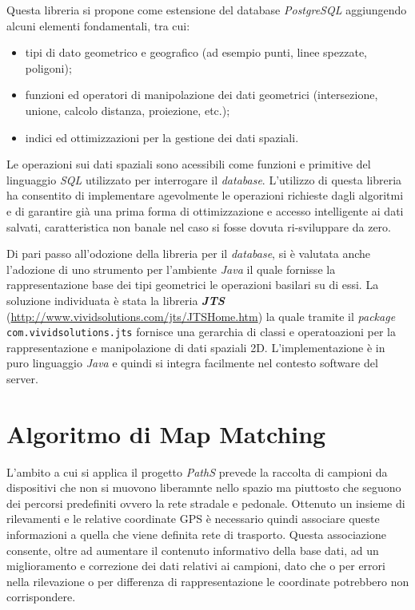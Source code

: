 Questa libreria si propone come estensione del database \emph{PostgreSQL} aggiungendo alcuni elementi fondamentali, tra cui:
\begin{itemize}
\item tipi di dato geometrico e geografico (ad esempio punti, linee spezzate, poligoni);
\item funzioni ed operatori di manipolazione dei dati geometrici (intersezione, unione, calcolo distanza, proiezione, etc.);
\item indici ed ottimizzazioni per la gestione dei dati spaziali.
\end{itemize}
Le operazioni sui dati spaziali sono acessibili come funzioni e primitive del linguaggio \emph{SQL} utilizzato per interrogare il \emph{database}. L'utilizzo di questa libreria ha consentito di implementare agevolmente le operazioni richieste dagli algoritmi e di garantire già una prima forma di ottimizzazione e accesso intelligente ai dati salvati, caratteristica non banale nel caso si fosse dovuta ri-sviluppare da zero.

Di pari passo all'odozione della libreria per il \emph{database}, si è valutata anche l'adozione di uno strumento per l'ambiente \emph{Java} il quale fornisse la rappresentazione base dei tipi geometrici le operazioni basilari su di essi. La soluzione individuata è stata la libreria \textbf{\emph{JTS}} (\url{http://www.vividsolutions.com/jts/JTSHome.htm}) la quale tramite il \emph{package} \texttt{com.\-vividsolutions.\-jts} fornisce una gerarchia di classi e operatoazioni per la rappresentazione e manipolazione di dati spaziali 2D. L'implementazione è in puro linguaggio \emph{Java} e quindi si integra facilmente nel contesto software del server.


\section{Algoritmo di Map Matching}
L'ambito a cui si applica il progetto \emph{PathS} prevede la raccolta di campioni da dispositivi che non si muovono liberamnte nello spazio ma piuttosto che seguono dei percorsi predefiniti ovvero la rete stradale e pedonale. Ottenuto un insieme di rilevamenti e le relative coordinate GPS è necessario quindi associare queste informazioni a quella che viene definita rete di trasporto. Questa associazione consente, oltre ad aumentare il contenuto informativo della base dati, ad un miglioramento e correzione dei dati relativi ai campioni, dato che o per errori nella rilevazione o per differenza di rappresentazione le coordinate potrebbero non corrispondere. 

